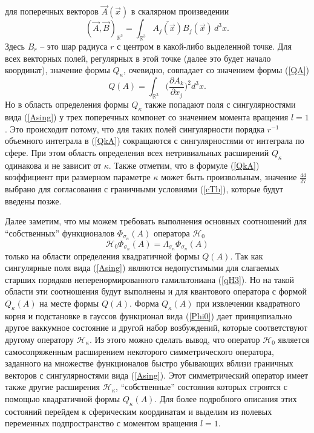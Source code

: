 \documentclass[12pt]{article}
\newcommand{\ol}{\overline}
\newcommand{\HH}{\mathscr{H}}
\newcommand{\RR}{\mathbb{R}}
\begin{document}
    для поперечных векторов
$ \vec{A}(\vec{x}) $
    в скалярном произведении
\begin{equation*}
    (\vec{A},\vec{B})_{\RR^{3}} = \int_{\RR^{3}}
	\ol{A_{j}(\vec{x})} B_{j}(\vec{x}) \,d^{3}x .
\end{equation*}
    Здесь
$ B_{r} $ -- это шар радиуса
$ r $
    с центром в какой-либо выделенной точке.
    Для всех векторных полей, регулярных в этой точке (далее это будет
    начало координат), значение
    формы
$ Q_{\kappa} $,
    очевидно, совпадает со значением формы
(\ref{QA})
\begin{equation*}
        Q(A) = \int_{\RR^{3}}
        \bigl(\frac{\partial A_{k}}{\partial x_{j}}\bigr)^{2} d^{3} x .
\end{equation*}
    Но в область определения формы
$ Q_{\kappa} $
    также попадают поля с сингулярностями вида
(\ref{Asing})
    у трех поперечных компонет со значением момента вращения
$ l=1 $.
    Это происходит потому, что для таких полей сингулярности порядка
$ r^{-1} $
    объемного интеграла в
(\ref{QkA})
    сокращаются с сингулярностями от интеграла по сфере.
    При этом область определения всех нетривиальных расширений
$ Q_{\kappa} $
    одинакова и не зависит от
$ \kappa $.
    Также отметим, что в формуле
(\ref{QkA})
    коэффициент при размерном параметре
$ \kappa $
    может быть произвольным, значение
$ \frac{44}{27} $
    выбрано для согласования с граничными условиями
(\ref{cTb}),
    которые будут введены позже.

    Далее заметим, что мы можем требовать выполнения основных соотношений
    для ``собственных'' функционалов
$ \Phi_{\sigma_{n}}(A) $
    оператора
$ \HH_{0} $
\begin{equation*}
    \HH_{0} \Phi_{\sigma_{n}}(A) = \Lambda_{\sigma_{n}} \Phi_{\sigma_{n}}(A)
\end{equation*}
    только на области определения квадратичной формы
$ Q(A) $.
    Так как сингулярные поля вида
(\ref{Asing})
    являются недопустимыми для слагаемых старших порядков неперенормированного
    гамильтониана
(\ref{qH3}).
    Но на такой области эти соотношения будут выполнены и для
    квантового оператора с формой
$ Q_{\kappa}(A) $
    на месте формы
$ Q(A) $.
    Форма
$ Q_{\kappa}(A) $
    при извлечении квадратного корня и подстановке в гауссов функционал
    вида
(\ref{Phi0})
    дает принципиально другое ваккумное состояние и другой набор возбуждений,
    которые соответствуют другому оператору
$ \HH_{\kappa} $.
    Из этого можно сделать вывод, что оператор
$ \HH_{0} $
    является самосопряженным расширением некоторого симметрического оператора,
    заданного на множестве функционалов быстро убывающих вблизи
    граничных векторов с сингулярностями вида
(\ref{Asing}).
    Этот симметрический оператор имеет также другие расширения
$ \HH_{\kappa} $,
    ``собственные'' состояния которых строятся с помощью
    квадратичной формы
$ Q_{\kappa}(A) $.
    Для более подробного описания этих состояний перейдем
    к сферическим координатам и выделим из полевых переменных подпространство
    с моментом вращения
$ l=1 $.
    
\end{document}
